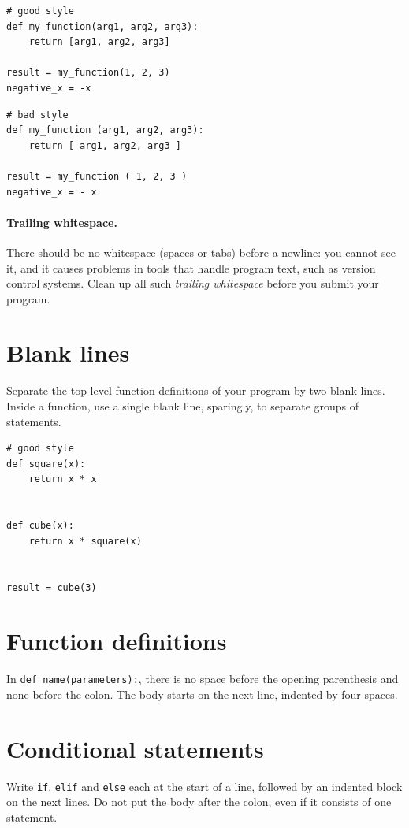 \begin{lstlisting}
# good style
def my_function(arg1, arg2, arg3):
    return [arg1, arg2, arg3]

result = my_function(1, 2, 3)
negative_x = -x
\end{lstlisting}

\begin{lstlisting}
# bad style
def my_function (arg1, arg2, arg3):
    return [ arg1, arg2, arg3 ]

result = my_function ( 1, 2, 3 )
negative_x = - x
\end{lstlisting}

\paragraph{Trailing whitespace.} There should be no whitespace (spaces or tabs) before a newline:
you cannot see it, and it causes problems in tools that handle program text, such as version control
systems. Clean up all such \emph{trailing whitespace} before you submit your program.

\section*{Blank lines}

Separate the top-level function definitions of your program by two blank lines. Inside a function,
use a single blank line, sparingly, to separate groups of statements.

\begin{lstlisting}
# good style
def square(x):
    return x * x


def cube(x):
    return x * square(x)


result = cube(3)
\end{lstlisting}

\section*{Function definitions}

In \lstinline{def name(parameters):}, there is no space before the opening parenthesis and none
before the colon. The body starts on the next line, indented by four spaces.

\section*{Conditional statements}

Write \lstinline{if}, \lstinline{elif} and \lstinline{else} each at the start of a line, followed by
an indented block on the next lines. Do not put the body after the colon, even if it consists of
one statement.

